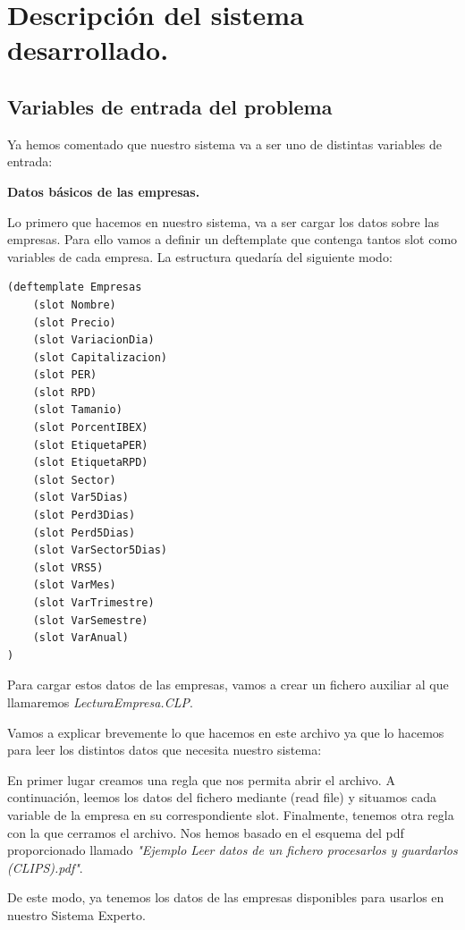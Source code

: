 \documentclass[12pt]{article}
\begin{document}
\newpage
\section{Descripción del sistema desarrollado.}
\subsection{Variables de entrada del problema}
Ya hemos comentado que nuestro sistema va a ser uno de distintas variables de entrada:

\begin{center}
	\textbf{Datos básicos de las empresas.}
\end{center}
Lo primero que hacemos en nuestro sistema, va a ser cargar los datos sobre las empresas. Para ello vamos a definir un deftemplate que contenga tantos slot como variables de cada empresa. La estructura quedaría del siguiente modo:

\begin{lstlisting}
(deftemplate Empresas
	(slot Nombre)
	(slot Precio)
	(slot VariacionDia)
	(slot Capitalizacion)
	(slot PER)
	(slot RPD)
	(slot Tamanio)
	(slot PorcentIBEX)
	(slot EtiquetaPER)
	(slot EtiquetaRPD)
	(slot Sector)
	(slot Var5Dias)
	(slot Perd3Dias)
	(slot Perd5Dias)
	(slot VarSector5Dias)
	(slot VRS5)
	(slot VarMes)
	(slot VarTrimestre)
	(slot VarSemestre)
	(slot VarAnual)
)
\end{lstlisting}


Para cargar estos datos de las empresas, vamos a crear un fichero auxiliar al que llamaremos \textit{LecturaEmpresa.CLP}.

Vamos a explicar brevemente lo que hacemos en este archivo ya que lo hacemos para leer los distintos datos que necesita nuestro sistema:

En primer lugar creamos una regla que nos permita abrir el archivo. A continuación, leemos los datos del fichero mediante (read file) y situamos cada variable de la empresa en su correspondiente slot. Finalmente, tenemos otra regla con la que cerramos el archivo. Nos hemos basado en el esquema del pdf proporcionado llamado \textit{"Ejemplo Leer datos de un fichero procesarlos y guardarlos (CLIPS).pdf"}.

De este modo, ya tenemos los datos de las empresas disponibles para usarlos en nuestro Sistema Experto. 
\end{document}
